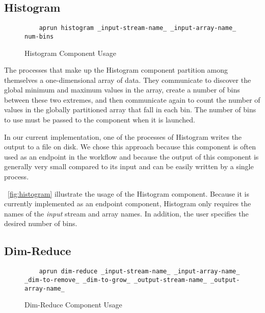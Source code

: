 \subsection{Histogram}

\begin{figure}
  \begin{lstlisting}
    aprun histogram _input-stream-name_ _input-array-name_ num-bins
  \end{lstlisting}
  \caption{Histogram Component Usage}
  \label{fig:histogram}
\end{figure}

The processes that make up the Histogram component
partition among themselves a one-dimensional
array of data. They communicate to discover the global
minimum and maximum values in the array, create a
number of bins between these two extremes, and
then communicate again to count the number of values in the
globally partitioned array that fall in each bin.
The number of bins to use must be passed to the
component when it is launched.

In our current implementation, one of the processes
of Histogram writes the
output to a file on disk. We chose this approach
because this component is often used as an
endpoint in the workflow and because the output of this
component is generally very small compared to its input
and can be easily written by a single process.

~\autoref{fig:histogram} illustrate the usage of
the Histogram component. Because it is currently
implemented as an endpoint component, Histogram
only requires the names of the \textit{input}
stream and array names. In addition, the user
specifies the desired number of bins.

\subsection{Dim-Reduce}

\begin{figure}
  \begin{lstlisting}
    aprun dim-reduce _input-stream-name_ _input-array-name_ _dim-to-remove_ _dim-to-grow_ _output-stream-name_ _output-array-name_
  \end{lstlisting}
  \caption{Dim-Reduce Component Usage}
  \label{fig:dim-reduce}
\end{figure}


